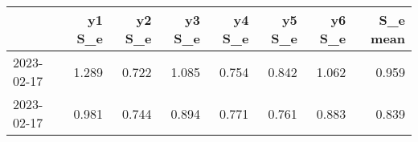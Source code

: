 \begin{tabular}{lrrrrrrr}
\toprule
{} &  y1 S\_e &  y2 S\_e &  y3 S\_e &  y4 S\_e &  y5 S\_e &  y6 S\_e &  S\_e mean \\
\midrule
2023-02-17 &   1.289 &   0.722 &   1.085 &   0.754 &   0.842 &   1.062 &     0.959 \\
2023-02-17 &   0.981 &   0.744 &   0.894 &   0.771 &   0.761 &   0.883 &     0.839 \\
\bottomrule
\end{tabular}
